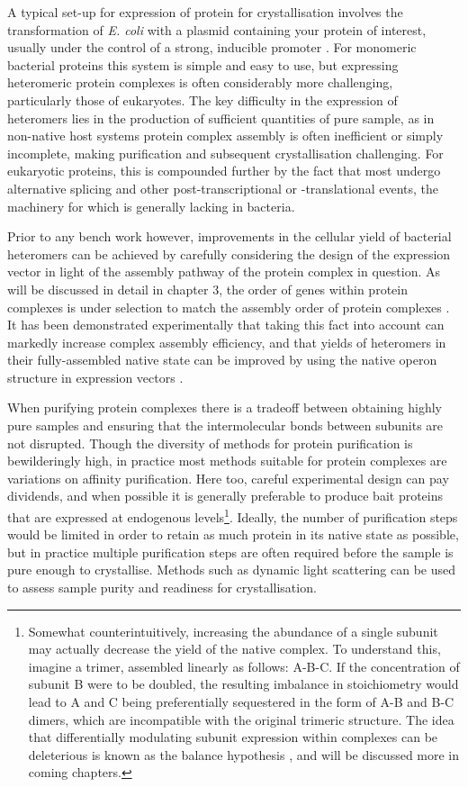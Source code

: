 \documentclass[a4paper,11pt,twoside,openright]{scrbook}
\begin{document}
A typical set-up for expression of protein for crystallisation involves the transformation of \textit{E. coli} with a plasmid containing your protein of interest, usually under the control of a strong, inducible promoter \cite{Rosano2014}. For monomeric bacterial proteins this system is simple and easy to use, but expressing heteromeric protein complexes is often considerably more challenging, particularly those of eukaryotes. The key difficulty in the expression of heteromers lies in the production of sufficient quantities of pure sample, as in non-native host systems protein complex assembly is often inefficient or simply incomplete, making purification and subsequent crystallisation challenging. For eukaryotic proteins, this is compounded further by the fact that most undergo alternative splicing and other post-transcriptional or -translational events, the machinery for which is generally lacking in bacteria.

Prior to any bench work however, improvements in the cellular yield of bacterial heteromers can be achieved by carefully considering the design of the expression vector in light of the assembly pathway of the protein complex in question. As will be discussed in detail in chapter 3, the order of genes within protein complexes is under selection to match the assembly order of protein complexes \cite{Wells2016}. It has been demonstrated experimentally that taking this fact into account can markedly increase complex assembly efficiency, and that yields of heteromers in their fully-assembled native state can be improved by using the native operon structure in expression vectors \cite{Shieh2015a, Poulsen2010}.

When purifying protein complexes there is a tradeoff between obtaining highly pure samples and ensuring that the intermolecular bonds between subunits are not disrupted. Though the diversity of methods for protein purification is bewilderingly high, in practice most methods suitable for protein complexes are variations on affinity purification. Here too, careful experimental design can pay dividends, and when possible it is generally preferable to produce bait proteins that are expressed at endogenous levels\footnote{Somewhat counterintuitively, increasing the abundance of a single subunit may actually decrease the yield of the native complex. To understand this, imagine a trimer, assembled linearly as follows: A-B-C. If the concentration of subunit B were to be doubled, the resulting imbalance in stoichiometry would lead to A and C being preferentially sequestered in the form of A-B and B-C dimers, which are incompatible with the original trimeric structure. The idea that differentially modulating subunit expression within complexes can be deleterious is known as the balance hypothesis \cite{Papp2003}, and will be discussed more in coming chapters.}. Ideally, the number of purification steps would be limited in order to retain as much protein in its native state as possible, but in practice multiple purification steps are often required before the sample is pure enough to crystallise. Methods such as dynamic light scattering \cite{Ni2013} can be used to assess sample purity and readiness for crystallisation.
\end{document}
